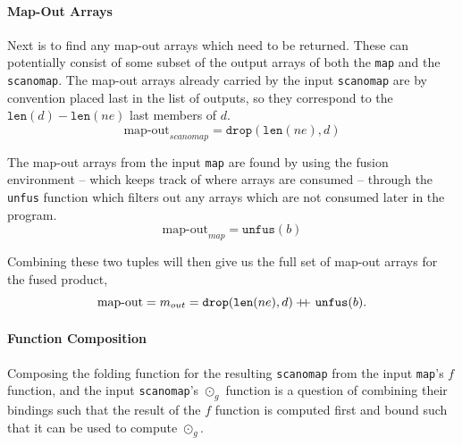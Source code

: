 \documentclass[11pt]{article}
\newcommand\doubleplus{+\kern-1.3ex+\kern0.8ex}
\begin{document}
\paragraph{Map-Out Arrays}
Next is to find any map-out arrays which need to be returned. These can potentially consist of some subset of the output arrays of both the \texttt{map} and the \texttt{scanomap}. The map-out arrays
 already carried by the input \texttt{scanomap} are by convention placed last in the list of outputs, so they correspond to the $\mathtt{len}(d) - \mathtt{len}(ne)$ last members of $d$.
$$\text{map-out}_{scanomap} = \mathtt{drop}(\mathtt{len}(ne),d)$$

The map-out arrays from the input \texttt{map} are found by using the fusion environment
 -- which keeps track of where arrays are consumed -- through the \texttt{unfus} function which
 filters out any arrays which are not consumed later in the program.
$$\text{map-out}_{map} = \mathtt{unfus} (b)$$

Combining these two tuples will then give us the full set of map-out arrays for the fused product,
$$\text{map-out} = m_{out} = \mathtt{drop}(\mathtt{len}(ne),d) \doubleplus \mathtt{unfus} (b)\mathnormal{.}$$
\paragraph{Function Composition}
\setcounter{equation}{0}
Composing the folding function for the resulting \texttt{scanomap} from the input \texttt{map}'s $f$ function, and the input \texttt{scanomap}'s $\odot_g$ function is a question of combining their
 bindings such that the result of the $f$ function is computed first and bound such that it can be used to compute $\odot_g$.
\end{document}
